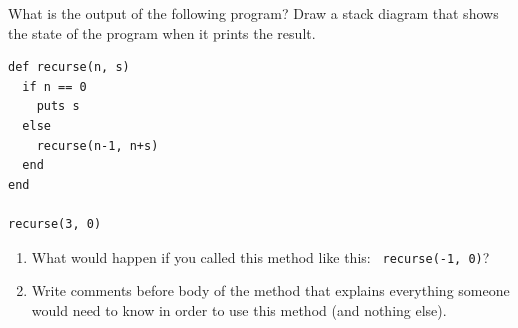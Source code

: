 \documentclass[10pt]{book}
\begin{document}
\begin{exercise}
What is the output of the following program?
Draw a stack diagram that shows the state of the program
when it prints the result.

\begin{verbatim}
def recurse(n, s)
  if n == 0
    puts s
  else
    recurse(n-1, n+s)
  end
end

recurse(3, 0)
\end{verbatim}

\begin{enumerate}

\item What would happen if you called this method like this: {\tt
  recurse(-1, 0)}?

\item Write comments before body of the method that explains everything someone would need to
  know in order to use this method (and nothing else).

\end{enumerate}

\end{exercise}
\end{document}
